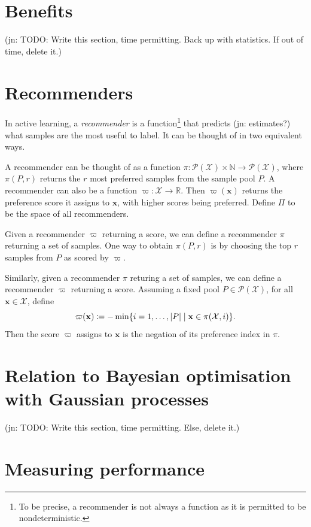 \documentclass[11pt,twoside,openright]{report}
\newcommand\bbN{\mathbb{N}}
\newcommand\bbR{\mathbb{R}}
\newcommand\bx{\mathbf{x}}
\newcommand\cP{\mathcal{P}}
\newcommand\cX{\mathcal{X}}
\newcommand\abs[1]{\left|#1\right|}
\newcommand\jn[1]{{\color{red}(jn: #1)}}
\begin{document}
\section{Benefits}

\jn{TODO: Write this section, time permitting. Back up with statistics. If out of time, delete it.}

\section{Recommenders}

In active learning, a \textit{recommender} is a function\footnote{To be precise, a recommender is not always a function as it is permitted to be nondeterministic.} that predicts \jn{estimates?} what samples are the most useful to label. It can be thought of in two equivalent ways.

A recommender can be thought of as a function $\pi : \cP(\cX) \times \bbN \to \cP(\cX)$, where $\pi(P, r)$ returns the $r$ most preferred samples from the sample pool $P$. A recommender can also be a function $\varpi : \cX \to \bbR$. Then $\varpi(\bx)$ returns the preference score it assigns to $\bx$, with higher scores being preferred. Define $\Pi$ to be the space of all recommenders.

Given a recommender $\varpi$ returning a score, we can define a recommender $\pi$ returning a set of samples. One way to obtain $\pi(P, r)$ is by choosing the top $r$ samples from $P$ as scored by $\varpi$.

Similarly, given a recommender $\pi$ returing a set of samples, we can define a recommender $\varpi$ returning a score. Assuming a fixed pool $P \in \cP(\cX)$, for all $\bx\in\cX$, define\[
  \varpi(\bx) \coloneqq -\min \{ i = 1, \dots, \abs{P} \mid \bx \in \pi(\cX, i)\} \text.
\] Then the score $\varpi$ assigns to $\bx$ is the negation of its preference index in $\pi$.


\section{Relation to Bayesian optimisation with Gaussian processes}

\jn{TODO: Write this section, time permitting. Else, delete it.}


\section{Measuring performance}
\end{document}

